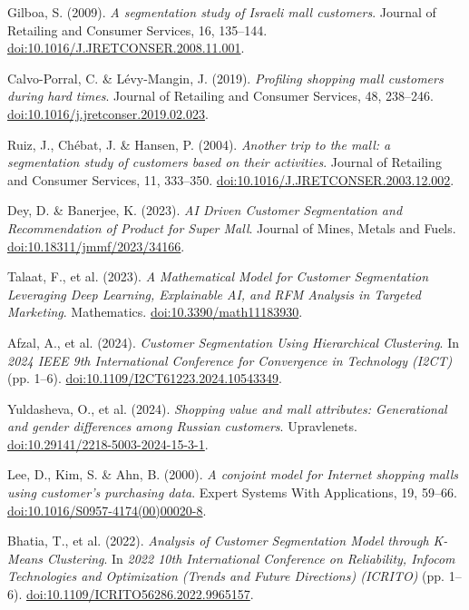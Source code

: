 \documentclass[10pt]{article}
\newcommand{\doi}[1]{\href{https://doi.org/#1}{doi:#1}}
\begin{document}
\begin{thebibliography}{99}

    Gilboa, S. (2009). \textit{A segmentation study of Israeli mall customers}. Journal of Retailing and Consumer Services, 16, 135--144. \doi{10.1016/J.JRETCONSER.2008.11.001}.
    
    Calvo-Porral, C. \& Lévy-Mangin, J. (2019). \textit{Profiling shopping mall customers during hard times}. Journal of Retailing and Consumer Services, 48, 238--246. \doi{10.1016/j.jretconser.2019.02.023}.
    
    Ruiz, J., Chébat, J. \& Hansen, P. (2004). \textit{Another trip to the mall: a segmentation study of customers based on their activities}. Journal of Retailing and Consumer Services, 11, 333--350. \doi{10.1016/J.JRETCONSER.2003.12.002}.
    
    Dey, D. \& Banerjee, K. (2023). \textit{AI Driven Customer Segmentation and Recommendation of Product for Super Mall}. Journal of Mines, Metals and Fuels. \doi{10.18311/jmmf/2023/34166}.
    
    Talaat, F., et al. (2023). \textit{A Mathematical Model for Customer Segmentation Leveraging Deep Learning, Explainable AI, and RFM Analysis in Targeted Marketing}. Mathematics. \doi{10.3390/math11183930}.
    
    Afzal, A., et al. (2024). \textit{Customer Segmentation Using Hierarchical Clustering}. In \textit{2024 IEEE 9th International Conference for Convergence in Technology (I2CT)} (pp. 1--6). \doi{10.1109/I2CT61223.2024.10543349}.
    
    Yuldasheva, O., et al. (2024). \textit{Shopping value and mall attributes: Generational and gender differences among Russian customers}. Upravlenets. \doi{10.29141/2218-5003-2024-15-3-1}.
    
    Lee, D., Kim, S. \& Ahn, B. (2000). \textit{A conjoint model for Internet shopping malls using customer's purchasing data}. Expert Systems With Applications, 19, 59--66. \doi{10.1016/S0957-4174(00)00020-8}.
    
    Bhatia, T., et al. (2022). \textit{Analysis of Customer Segmentation Model through K-Means Clustering}. In \textit{2022 10th International Conference on Reliability, Infocom Technologies and Optimization (Trends and Future Directions) (ICRITO)} (pp. 1--6). \doi{10.1109/ICRITO56286.2022.9965157}.
    

\end{thebibliography}
\end{document}
